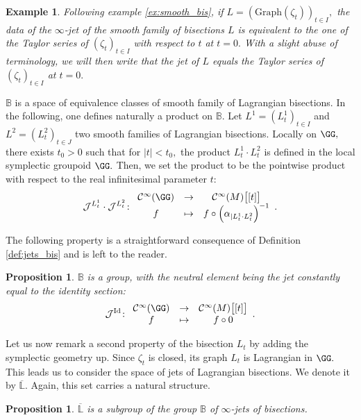 \documentclass[a4paper,11pt]{article}
\newcommand{\Graph}{\text{Graph}}
\newcommand{\func}[1]{\mathcal{C}^{\infty}(#1)}
\newtheorem{proposition}[theorem]{Proposition}
\newtheorem{ex}[theorem]{Example}
\begin{document}
\begin{ex}\label{ex:jet_bis}
Following example \ref{ex:smooth_bis}, if $L = (\Graph(\zeta_t))_{t \in I},$ the data of the $\infty$-jet of the smooth family of bisections $L$ is equivalent to the one of the Taylor series of $(\zeta_t)_{t \in I}$ with respect to $t$ at $t=0.$ With a slight abuse of terminology, we will then write that the jet of $L$ equals the Taylor series of $(\zeta_t)_{t \in I}$ at $t=0.$ 
\end{ex}

$\mathbb{B}$ is a space of equivalence classes of smooth family of Lagrangian bisections. In the following, one defines naturally a product on $\mathbb{B}$. Let $L^1 = (L^1_t)_{t \in I}$ and $L^2 = (L^2_t)_{t \in J}$ two smooth families of Lagrangian bisections. Locally on $\GG,$ there exists $t_0 >0$ such that for $|t|<t_0,$ the product $L_t^1 \cdot L_t^2$ is defined in the local symplectic groupoid $\GG.$ Then, we set the product to be the pointwise product with respect to the real infinitesimal parameter $t:$
\[
\mathcal{J}^{L^1_t} \cdot \mathcal{J}^{L^2_t} \colon 
\begin{array}{ccc}
\func{\GG} & \to & \func{M}\bigl[[t]\bigr]\\
f & \mapsto & f \circ \left(\alpha_{|L_t^1 \cdot L_t^2 }\right)^{-1} 
\end{array}.
\]

The following property is a straightforward consequence of Definition \ref{def:jets_bis} and is left to the reader.
\begin{proposition}
$\mathbb{B}$ is a group, with the neutral element being the jet constantly equal to the identity section:
\[
\mathcal{J}^{\text{Id}} \colon 
\begin{array}{ccc}
\func{\GG} & \to & \func{M}\bigl[[t]\bigr]\\
f & \mapsto & f \circ 0
\end{array}.
\]
\end{proposition}

Let us now remark a second property of the bisection $L_t$ by adding the symplectic geometry up. Since $\zeta_t$ is closed, its graph $L_t$ is Lagrangian in $\GG.$ This leads us to consider the space of jets of Lagrangian bisections. We denote it by $\overline{\mathbb{ L}}.$ Again, this set carries a natural structure.
\begin{proposition}
$\overline{\mathbb{ L}}$ is a subgroup of the group $\mathbb{B}$ of $\infty$-jets of bisections.
\end{proposition}
\end{document}
